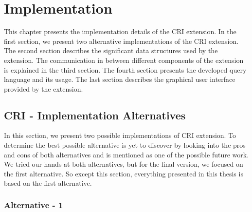 \chapter{Implementation} \label{chap:Implementation}
This chapter presents the implementation details of the CRI extension. In the first section, we present two alternative implementations of the CRI extension. The second section describes the significant data structures used by the extension. The communication in between different components of the extension is explained in the third section. The fourth section presents the developed query language and its usage. The last section describes the graphical user interface provided by the extension.

\section{CRI - Implementation Alternatives }
In this section, we present two possible implementations of CRI extension. To determine the best possible alternative is yet to discover by looking into the pros and cons of both alternatives and is mentioned as one of the possible future work. We tried our hands at both alternatives, but for the final version, we focused on the first alternative. So except this section, everything presented in this thesis is based on the first alternative. 


\subsection{Alternative - 1}


